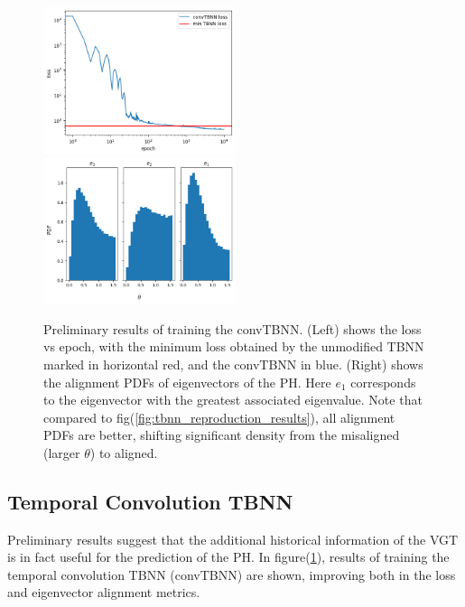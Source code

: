 \begin{figure}
    \centering
    \includegraphics[width=0.5\textwidth]{LagrangianDeformationModels/figs/conv_tbnn_loss.png}%
    \includegraphics[width=0.5\textwidth]{LagrangianDeformationModels/figs/conv_tbnn_ph_eig_align.png}
    \caption{Preliminary results of training the convTBNN. (Left) shows the loss vs epoch, with the minimum loss obtained by the unmodified TBNN marked in horizontal red, and the convTBNN in blue. (Right) shows the alignment PDFs of eigenvectors of the PH. Here $e_1$ corresponds to the eigenvector with the greatest associated eigenvalue. Note that compared to fig(\ref{fig:tbnn_reproduction_results}), all alignment PDFs are better, shifting significant density from the misaligned (larger $\theta$) to aligned.}
    \label{fig:conv_tbnn_results}
\end{figure}

\subsection{Temporal Convolution TBNN}
Preliminary results suggest that the additional historical information of the VGT is in fact useful for the prediction of the PH. In figure(\ref{fig:conv_tbnn_results}), results of training the temporal convolution TBNN (convTBNN) are shown, improving both in the loss and eigenvector alignment metrics.

